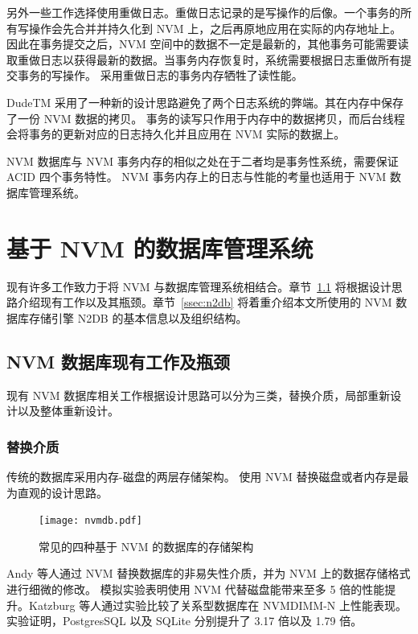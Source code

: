 另外一些工作选择使用重做日志\cite{volos_mnemosyne_2011, giles_softwrap_2015, giles2017continuous}。重做日志记录的是写操作的后像。一个事务的所有写操作会先合并并持久化到 NVM 上，之后再原地应用在实际的内存地址上。因此在事务提交之后，NVM 空间中的数据不一定是最新的，其他事务可能需要读取重做日志以获得最新的数据。当事务内存恢复时，系统需要根据日志重做所有提交事务的写操作。
采用重做日志的事务内存牺牲了读性能。

DudeTM 采用了一种新的设计思路避免了两个日志系统的弊端\cite{liu_dudetm_2017}。其在内存中保存了一份 NVM 数据的拷贝。
事务的读写只作用于内存中的数据拷贝，而后台线程会将事务的更新对应的日志持久化并且应用在 NVM 实际的数据上。

NVM 数据库与 NVM 事务内存的相似之处在于二者均是事务性系统，需要保证 ACID 四个事务特性。
NVM 事务内存上的日志与性能的考量也适用于 NVM 数据库管理系统。

\section{基于 NVM 的数据库管理系统}

现有许多工作致力于将 NVM 与数据库管理系统相结合。章节~\ref{ssec:nvmdb} 将根据设计思路介绍现有工作以及其瓶颈。章节~\ref{ssec:n2db} 将着重介绍本文所使用的 NVM 数据库存储引擎 N2DB 的基本信息以及组织结构。

\subsection{NVM 数据库现有工作及瓶颈}
\label{ssec:nvmdb}

现有 NVM 数据库相关工作根据设计思路可以分为三类，替换介质，局部重新设计以及整体重新设计。

\subsubsection{替换介质}

传统的数据库采用内存-磁盘的两层存储架构。
使用 NVM 替换磁盘或者内存是最为直观的设计思路。

\begin{figure}
    \centering
    \texttt{[image: nvmdb.pdf]}
    \caption{常见的四种基于 NVM 的数据库的存储架构}
    \label{fig:nvm-structure}
\end{figure}

Andy 等人通过 NVM 替换数据库的非易失性介质，并为 NVM 上的数据存储格式进行细微的修改\cite{arulraj_lets_2015, arulraj_how_2017}。
模拟实验表明使用 NVM 代替磁盘能带来至多 5 倍的性能提升。Katzburg 等人通过实验比较了关系型数据库在 NVMDIMM-N 上性能表现\cite{katzburg_nvdimm-n_2018}。
实验证明，PostgresSQL 以及 SQLite 分别提升了 3.17 倍以及 1.79 倍。


